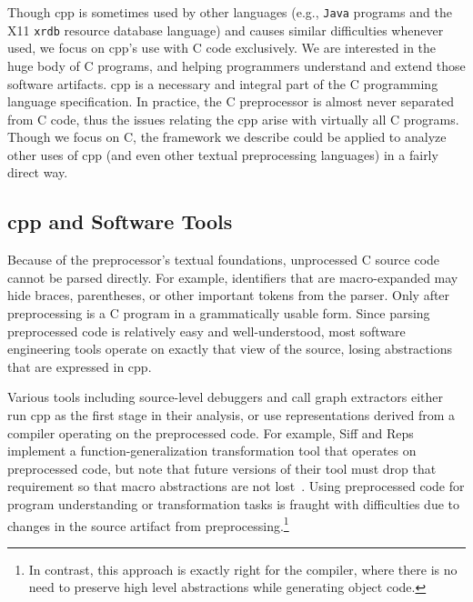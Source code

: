 \documentclass{article}
\newcommand{\Cpp}{\mbox{\textsf{cpp}}}
\newcommand{\C}{\mbox{C}}
\newcommand{\eg}{e.g.,}
\begin{document}
Though \Cpp{} is sometimes used by other languages (\eg{}
\texttt{Java} programs and the X11 \texttt{xrdb} resource database
language) and causes similar difficulties whenever used, we focus on
\Cpp{}'s use with \C{} code exclusively.  We are interested in the huge
body of \C{} programs, and helping programmers understand and extend
those software artifacts. \Cpp{} is a necessary and integral part of the
\C{} programming language specification.  In practice, the \C{}
preprocessor is almost never separated from \C{} code, thus the issues
relating the \Cpp{} arise with virtually all \C{} programs.  Though we
focus on \C{}, the framework we describe could be applied to analyze other
uses of \Cpp{} (and even other textual preprocessing languages) in a
fairly direct way.



\subsection{\Cpp{} and Software Tools}

Because of the preprocessor's textual foundations, unprocessed \C{} source code
cannot be parsed directly.  For example, identifiers that are macro-expanded may
hide braces, parentheses, or other 
important tokens from the parser.  Only after preprocessing is a \C{} program
in a grammatically usable form. Since parsing
preprocessed code is relatively easy and well-understood,
most software engineering tools operate on
exactly that view of the source, losing abstractions that are
expressed in \Cpp{}.  

Various tools including source-level debuggers and call graph extractors
either run \Cpp{} as the first stage in their analysis, or use
representations derived from a compiler operating on the preprocessed
code.  For example,
Siff and Reps implement a function-generalization transformation
tool that operates on preprocessed code, but note that future versions
of their tool must drop that requirement so that macro abstractions are
not lost~\cite{Siff96}. Using preprocessed code for program
understanding or transformation tasks is fraught with difficulties due
to changes in the source artifact from preprocessing.\footnote{In
  contrast, this approach is exactly right for the compiler, where there is
  no need to preserve high level abstractions while generating object
  code.}
\end{document}
